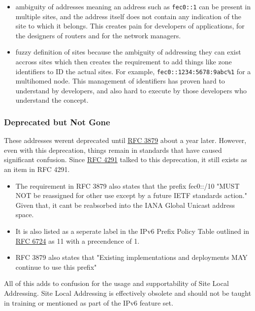 \documentclass[
]{article}
\providecommand{\tightlist}{%
  \setlength{\itemsep}{0pt}\setlength{\parskip}{0pt}}
\begin{document}
\begin{itemize}
\tightlist
\item
  ambiguity of addresses meaning an address such as \texttt{fec0::1} can
  be present in multiple sites, and the address itself does not contain
  any indication of the site to which it belongs. This creates pain for
  developers of applications, for the designers of routers and for the
  network managers.
\item
  fuzzy definition of sites because the ambiguity of addressing they can
  exist accross sites which then creates the requirement to add things
  like zone identifiers to ID the actual sites. For example,
  \texttt{fec0::1234:5678:9abc\%1} for a multihomed node. This
  management of identifiers has proven hard to understand by developers,
  and also hard to execute by those developers who understand the
  concept.
\end{itemize}

\subsubsection{Deprecated but Not Gone}\label{deprecated-but-not-gone}

These addresses weren\textquotesingle t deprecated until
\href{https://www.rfc-editor.org/rfc/rfc3879}{RFC 3879} about a year
later. However, even with this deprecation, things remain in standards
that have caused significant confusion. Since
\href{https://www.rfc-editor.org/rfc/rfc4291.html\#section-2.5.7}{RFC
4291} talked to this deprecation, it still exists as an item in RFC
4291.

\begin{itemize}
\tightlist
\item
  The requirement in RFC 3879 also states that the prefix fec0::/10
  "MUST NOT be reassigned for other use except by a future IETF
  standards action." Given that, it can\textquotesingle t be reabsorbed
  into the IANA Global Unicast address space.
\item
  It is also listed as a seperate label in the IPv6 Prefix Policy Table
  outlined in \href{https://www.rfc-editor.org/rfc/rfc6724.html}{RFC
  6724} as 11 with a precendence of 1.
\item
  RFC 3879 also states that "Existing implementations and deployments
  MAY continue to use this prefix"
\end{itemize}

All of this adds to confusion for the usage and supportability of Site
Local Addressing. Site Local Addressing is effectively obsolete and
should not be taught in training or mentioned as part of the IPv6
feature set.
\end{document}
